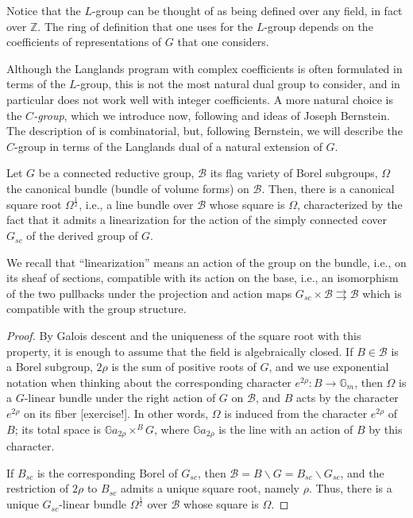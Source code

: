 Notice that the $L$-group can be thought of as being defined over any field, in fact over $\mathbb Z$. The ring of definition that one uses for the $L$-group depends on the coefficients of representations of $G$ that one considers.

Although the Langlands program with complex coefficients is often formulated in terms of the $L$-group, this is not the most natural dual group to consider, and in particular does not work well with integer coefficients. A more natural choice is the \emph{$C$-group}, which we introduce now, following \cite{Buzzard-Gee} and ideas of Joseph Bernstein. The description of \cite{Buzzard-Gee} is combinatorial, but, following Bernstein, we will describe the $C$-group in terms of the Langlands dual of a natural extension of $G$.

\begin{lemma}
 \label{lemma-squareroot-canonicalbundle}
Let $G$ be a connected reductive group, $\mathcal B$ its flag variety of Borel subgroups, $\Omega$ the canonical bundle (bundle of volume forms) on $\mathcal B$. Then, there is a canonical square root $\Omega^\frac{1}{2}$, i.e., a line bundle over $\mathcal B$ whose square is $\Omega$, characterized by the fact that it admits a linearization for the action of the simply connected cover $G_{sc}$ of the derived group of $G$. 
\end{lemma}

We recall that ``linearization'' means an action of the group on the bundle, i.e., on its sheaf of sections, compatible with its action on the base, i.e., an isomorphism of the two pullbacks under the projection and action maps $G_{sc} \times \mathcal B \rightrightarrows \mathcal B$ which is compatible with the group structure.

\begin{proof}
By Galois descent and the uniqueness of the square root with this property, it is enough to assume that the field is algebraically closed. If $B\in \mathcal B$ is a Borel subgroup, $2\rho$ is the sum of positive roots of $G$, and we use exponential notation when thinking about the corresponding character $e^{2\rho}:B\to \mathbb G_m$, then $\Omega$ is a $G$-linear bundle under the right action of $G$ on $\mathcal B$, and $B$ acts by the character $e^{2\rho}$ on its fiber [exercise!]. In other words, $\Omega$ is induced from the character $e^{2\rho}$ of $B$; its total space is $\mathbb Ga_{2\rho} \times^B G$,
where $\mathbb Ga_{2\rho}$ is the line with an action of $B$ by this character.

If $B_{sc}$ is the corresponding Borel of $G_{sc}$, then $\mathcal B = B\backslash G=B_{sc}\backslash G_{sc}$, and the restriction of $2\rho$ to $B_{sc}$ admits a unique square root, namely $\rho$. Thus, there is a unique $G_{sc}$-linear bundle $\Omega^{\frac{1}{2}}$ over $\mathcal B$ whose square is $\Omega$.
\end{proof}



